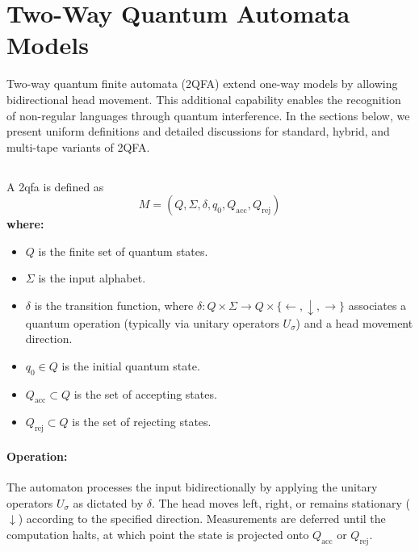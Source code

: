 \section{Two-Way Quantum Automata Models}
\label{sec:two-way-qfas}

Two-way quantum finite automata (2QFA) extend one-way models by allowing bidirectional head movement. This additional capability enables the recognition of non-regular languages through quantum interference. In the sections below, we present uniform definitions and detailed discussions for standard, hybrid, and multi-tape variants of 2QFA.


\subsection{}
\label{subsec:2qfa}
\begin{definition}
A \gls{2qfa} is defined as 
\[
M = (Q, \Sigma, \delta, q_0, Q_{\text{acc}}, Q_{\text{rej}})
\]
\textbf{where:}
\begin{itemize}
    \item \( Q \) is the finite set of quantum states.
    \item \( \Sigma \) is the input alphabet.
    \item \( \delta \) is the transition function, where \(\delta: Q \times \Sigma \to Q \times \{\leftarrow, \downarrow, \rightarrow\}\) associates a quantum operation (typically via unitary operators \( U_\sigma \)) and a head movement direction.
    \item \( q_0 \in Q \) is the initial quantum state.
    \item \( Q_{\text{acc}} \subset Q \) is the set of accepting states.
    \item \( Q_{\text{rej}} \subset Q \) is the set of rejecting states.
\end{itemize}
\end{definition}

\paragraph{Operation:}  
The automaton processes the input bidirectionally by applying the unitary operators \( U_\sigma \) as dictated by \( \delta \). The head moves left, right, or remains stationary (\(\downarrow\)) according to the specified direction. Measurements are deferred until the computation halts, at which point the state is projected onto \( Q_{\text{acc}} \) or \( Q_{\text{rej}} \).

